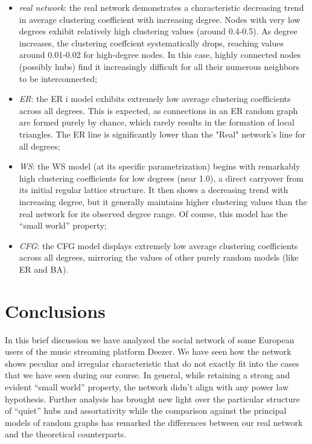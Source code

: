 \documentclass[12pt]{article}
\begin{document}
\begin{itemize}
	\item \textit{real network}: the real network demonstrates a characteristic decreasing trend in average clustering coefficient with increasing degree. Nodes with very low degrees exhibit relatively high clustering values (around 0.4-0.5). As degree increases, the clustering coeffcient systematically drops, reaching values around 0.01-0.02 for high-degree nodes. In this case, highly connected nodes (possibly hubs) find it increasingly difficult for all their numerous neighbors to be interconnected;
	\item \textit{ER}: the ER i model exhibits extremely low average clustering coefficients across all degrees. This is expected, as connections in an ER random graph are formed purely by chance, which rarely results in the formation of local triangles. The ER line is significantly lower than the "Real" network's line for all degrees;
	\item \textit{WS}: the WS model (at its specific parametrization) begins with remarkably high clustering coefficients for low degrees (near 1.0), a direct carryover from its initial regular lattice structure. It then shows a decreasing trend with increasing degree, but it generally maintains higher clustering values than the real network for its observed degree range. Of course, this model has the ``small world'' property;
	\item \textit{CFG}: the CFG model displays extremely low average clustering coefficients across all degrees, mirroring the values of other purely random models (like ER and BA).
\end{itemize}
\section{Conclusions}
In this brief discussion we have analyzed the social network of some European users of the music streaming platform Deezer. We have seen how the network shows peculiar and irregular characteristic that do not exactly fit into the cases that we have seen during our course. In general, while retaining a strong and evident ``small world'' property, the network didn't align with any power law hypothesis. Further analysis has brought new light over the particular structure of ``quiet'' hubs and assortativity while the comparison against the principal models of random graphs has remarked the differences between our real network and the theoretical counterparts.
\end{document}

